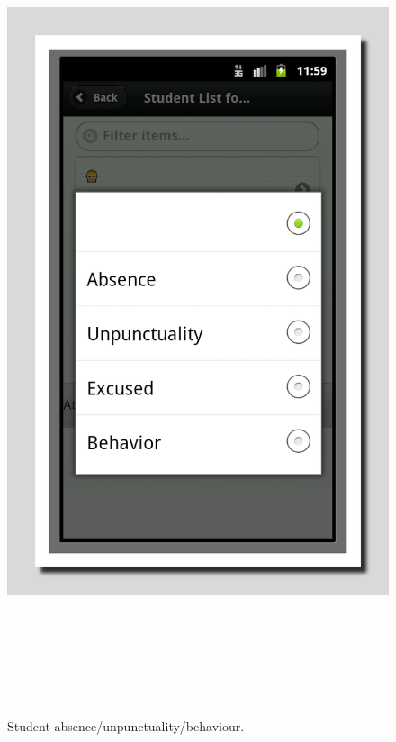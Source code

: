 \documentclass[a4paper]{article}
\begin{document}
\begin{enumerate}
\begin{enumerate}
\begin{figure}
\centering
\includegraphics[width=15.73cm,height=24.208cm]{PhoneGapProjectMSWLMemory-img/PhoneGapProjectMSWLMemory-img11.png}
\caption[Student absence/unpunctuality/behaviour.]{Student
absence/unpunctuality/behaviour.}

\end{figure}
\clearpage
\bigskip
\end{enumerate}
\end{enumerate}
\end{document}
